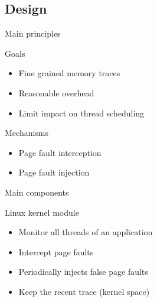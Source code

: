 \documentclass[xcolor={usenames,dvipsnames},hyperref={pdfusetitle}]{beamer}
\begin{document}
\subsection{Design}

\begin{frame}{Main principles}
    \begin{block}{Goals}
        \begin{itemize}
            \item Fine grained memory traces
            \item Reasonable overhead
            \item Limit impact on thread scheduling
        \end{itemize}
    \end{block}
    \pause
    \begin{alertblock}{Mechanisms}
        \begin{itemize}
            \item Page fault interception
            \item Page fault injection
        \end{itemize}
    \end{alertblock}
\end{frame}

\begin{frame}{Main components}
    \begin{alertblock}{Linux kernel module}
        \begin{itemize}
            \item Monitor all threads of an application
            \item Intercept page faults
            \item Periodically injects false page faults
            \item Keep the recent trace (kernel space)
        \end{itemize}
    \end{alertblock}
\end{frame}
\end{document}
